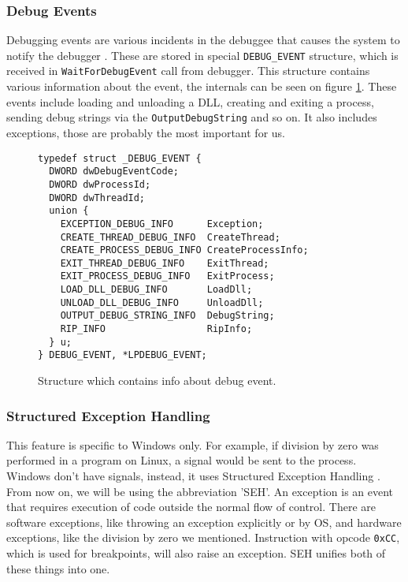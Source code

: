 \subsubsection*{Debug Events}\label{section:Debug Events}
Debugging events are various incidents in the debuggee that causes the system to notify the debugger \cite{windows-msdn-debug-events}. These are stored in special \texttt{DEBUG_EVENT} structure, which is received in \texttt{WaitForDebugEvent} call from debugger. This structure contains various information about the event, the internals can be seen on figure \ref{fig:DebugEvent}. These events include loading and unloading a DLL, creating and exiting a process, sending debug strings via the \texttt{OutputDebugString} and so on. It also includes exceptions, those are probably the most important for us. 
\begin{figure}
\begin{verbatim}
typedef struct _DEBUG_EVENT {
  DWORD dwDebugEventCode;
  DWORD dwProcessId;
  DWORD dwThreadId;
  union {
    EXCEPTION_DEBUG_INFO      Exception;
    CREATE_THREAD_DEBUG_INFO  CreateThread;
    CREATE_PROCESS_DEBUG_INFO CreateProcessInfo;
    EXIT_THREAD_DEBUG_INFO    ExitThread;
    EXIT_PROCESS_DEBUG_INFO   ExitProcess;
    LOAD_DLL_DEBUG_INFO       LoadDll;
    UNLOAD_DLL_DEBUG_INFO     UnloadDll;
    OUTPUT_DEBUG_STRING_INFO  DebugString;
    RIP_INFO                  RipInfo;
  } u;
} DEBUG_EVENT, *LPDEBUG_EVENT;
\end{verbatim}
\caption{Structure which contains info about debug event.}
\label{fig:DebugEvent}
\end{figure}

\subsubsection*{Structured Exception Handling}
This feature is specific to Windows only. For example, if division by zero was performed in a program on Linux,
a signal would be sent to the process. Windows don't have signals, instead, it uses Structured Exception Handling \cite{windows-msdn-seh}. 
From now on, we will be using the abbreviation 'SEH'.
An exception is an event that requires execution of code outside the normal flow of control. There are software exceptions,
like throwing an exception explicitly or by OS, and hardware exceptions, like the division by zero we mentioned.
Instruction with opcode \texttt{0xCC}, which is used for breakpoints, will also raise an exception. SEH unifies both of these things into one.


